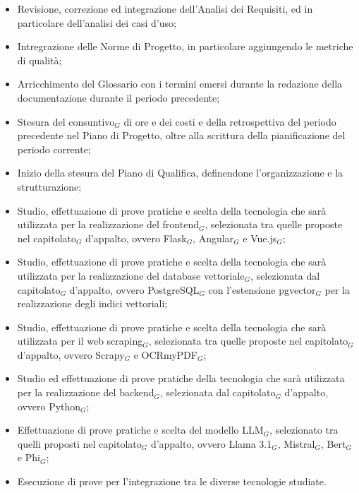 \begin{itemize}
    \item Revisione, correzione ed integrazione dell'Analisi dei Requisiti, ed in particolare dell'analisi dei casi d'uso;
    \item Intregrazione delle Norme di Progetto, in particolare aggiungendo le metriche di qualità;
    \item Arricchimento del Glossario con i termini emersi durante la redazione della documentazione durante il periodo precedente;
    \item Stesura del consuntivo$_G$ di ore e dei costi e della retrospettiva del periodo precedente nel Piano di Progetto, oltre alla scrittura della pianificazione del periodo corrente;
    \item Inizio della stesura del Piano di Qualifica, definendone l'organizzazione e la strutturazione;
    \item Studio, effettuazione di prove pratiche e scelta della tecnologia che sarà utilizzata per la realizzazione del frontend$_G$, selezionata tra quelle proposte nel capitolato$_G$ d'appalto, ovvero Flask$_G$, Angular$_G$ e Vue.js$_G$;
    \item Studio, effettuazione di prove pratiche e scelta della tecnologia che sarà utilizzata per la realizzazione del database vettoriale$_G$, selezionata dal capitolato$_G$ d'appalto, ovvero PostgreSQL$_G$ con l'estensione pgvector$_G$ per la realizzazione degli indici vettoriali;
    \item Studio, effettuazione di prove pratiche e scelta della tecnologia che sarà utilizzata per il web scraping$_G$, selezionata tra quelle proposte nel capitolato$_G$ d'appalto, ovvero Scrapy$_G$ e OCRmyPDF$_G$;
    \item Studio ed effettuazione di prove pratiche della tecnologia che sarà utilizzata per la realizzazione del backend$_G$, selezionata dal capitolato$_G$ d'appalto, ovvero Python$_G$;
    \item Effettuazione di prove pratiche e scelta del modello LLM$_G$, selezionato tra quelli proposti nel capitolato$_G$ d'appalto, ovvero Llama 3.1$_G$, Mistral$_G$, Bert$_G$ e Phi$_G$;
    \item Esecuzione di prove per l'integrazione tra le diverse tecnologie studiate.
\end{itemize}
